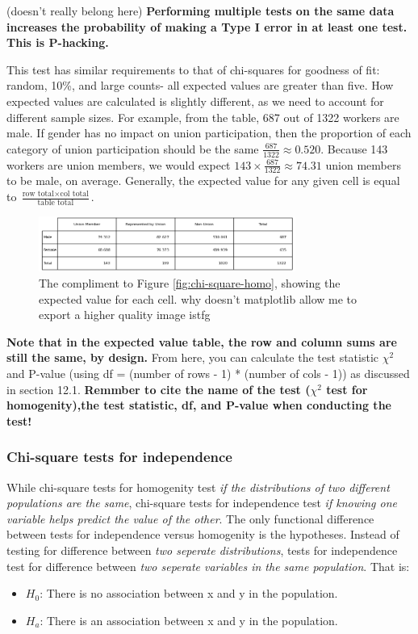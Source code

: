 \documentclass[12pt, a4paper]{article}
\theoremstyle{definition}
\begin{document}
(doesn't really belong here) \textbf{Performing multiple tests on the same data increases the probability of making a Type I error in at least one test. This is P-hacking.}

This test has similar requirements to that of chi-squares for goodness of fit: random, 10\%, and large counts- all expected values are greater than five.
How expected values are calculated is slightly different, as we need to account for different sample sizes.
For example, from the table, 687 out of 1322 workers are male.
If gender has no impact on union participation, then the proportion of each category of union participation should be the same $\frac{687}{1322} \approx 0.520$.
Because 143 workers are union members, we would expect $143 \times \frac{687}{1322} \approx 74.31$ union members to be male, on average.
Generally, the expected value for any given cell is equal to $\frac{\textrm{row total} \times \textrm{col total}}{\textrm{table total}}$.\\

\begin{figure}[t]
    \centering
    \includegraphics[width=0.75\textwidth]{chi-square-homogenity-ev.png}
    \caption{The compliment to Figure \ref{fig:chi-square-homo}, showing the expected value for each cell. why doesn't matplotlib allow me to export a higher quality image istfg}
    \label{fig:chi-square-homo-ev}
\end{figure}

\textbf{Note that in the expected value table, the row and column sums are still the same, by design.}
From here, you can calculate the test statistic $\chi ^ 2$ and P-value (using df = (number of rows - 1) * (number of cols - 1)) as discussed in section 12.1.
\textbf{Remmber to cite the name of the test ($\chi^2$ test for homogenity),the test statistic, df, and P-value when conducting the test!}

\subsubsection{Chi-square tests for independence}
While chi-square tests for homogenity test \textit{if the distributions of two different populations are the same}, chi-square tests for independence test \textit{if knowing one variable helps predict the value of the other}.
The only functional difference between tests for independence versus homogenity is the hypotheses.
Instead of testing for difference between \textit{two seperate distributions}, tests for independence test for difference between \textit{two seperate variables in the same population}.
That is:
\begin{itemize}
    \item $H_0$: There is no association between x and y in the population.
    \item $H_a$: There is an association between x and y in the population.
\end{itemize}
\end{document}
